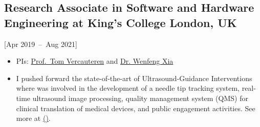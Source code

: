 \documentclass{mycv}
\begin{document}
\subsection{Research Associate in Software and Hardware Engineering at King's College London, UK}[Apr 2019~--~Aug 2021]
\begin{itemize}
  \item PIs: \href{https://cai4cai.ml}{Prof.~Tom Vercauteren} and  \href{https://www.purlkcl.org/}{Dr. Wenfeng Xia} 
  \item 
I pushed forward the state-of-the-art of Ultrasound-Guidance Interventions
	where was involved in the development of a needle tip tracking system, real-time ultrasound image processing, 
	quality management system (QMS) for clinical translation of medical devices, and public engagement activities.
	See more at \href{https://cai4cai.ml/author/miguel-xochicale/}{(\faExternalLink*)}.
\end{itemize}


\end{document}
